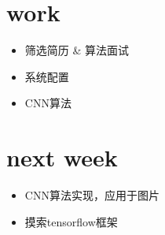 \documentclass[11pt]{article}
\author{章立}
\date{\today}
\title{}
\begin{document}
\tableofcontents

\section{work}
\label{sec:orgheadline1}
\begin{itemize}
\item 筛选简历 \& 算法面试
\item 系统配置
\item CNN算法
\end{itemize}
\section{next week}
\label{sec:orgheadline2}
\begin{itemize}
\item CNN算法实现，应用于图片
\item 摸索tensorflow框架
\end{itemize}
\end{document}
